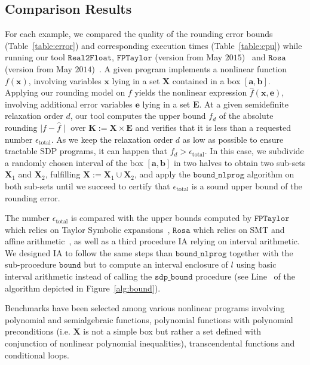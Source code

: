 \documentclass[preprint]{sigplanconf}
\newcommand{\x}{\mathbf{x}}
\newcommand{\e}{\mathbf{e}}
\renewcommand{\b}{\mathbf{b}}
\def\a{\mathbf{a}}
\def\E{\mathbf{E}}
\def\K{\mathbf{K}}
\def\X{\mathbf{X}}
\newcommand{\sdpbound}{\mathtt{sdp\_bound}}
\newcommand{\bound}{\mathtt{bound}}
\newcommand{\boundnlprog}{\mathtt{bound\_nlprog}}
\newcommand{\realtofloat}{\mathtt{Real2Float}}
\newcommand{\rosa}{\mathtt{Rosa}}
\newcommand{\fptaylor}{\mathtt{FPTaylor}}
\theoremstyle{plain}
\begin{document}
\subsection{Comparison Results}
For each example, we compared the quality of the rounding error bounds (Table~\ref{table:error}) and corresponding execution times (Table~\ref{table:cpu}) while running our tool $\realtofloat$, $\fptaylor$ (version from May $2015$)~\cite{fptaylor15} and $\rosa$ (version from  May $2014$)~\cite{Darulova14Popl}.
A given program implements a nonlinear function $f(\x)$, involving variables $\x$ lying in a set $\X$ contained in a box $[\a, \b]$.
Applying our rounding model on $f$ yields the nonlinear expression $\hat{f}(\x,\e)$, involving additional error variables $\e$ lying in a set $\E$. 
At a given semidefinite relaxation order $d$, our tool computes the upper bound $f_d$ of the absolute rounding $\mid f - \hat{f} \mid $ over $\K := \X \times \E$ and verifies that it is less than a requested number $\epsilon_{\text{total}}$. As we keep the relaxation order $d$ as low as possible to ensure tractable SDP programs, it can happen that $f_d > \epsilon_{\text{total}}$. 
 In this case, we subdivide a randomly chosen interval of the box  $[\a, \b]$ in two halves to obtain two sub-sets $\X_1$ and $\X_2$, fulfilling $\X := \X_1 \cup \X_2$, and apply the $\boundnlprog$ algorithm on both sub-sets until we succeed to certify that $\epsilon_{\text{total}}$ is a sound upper bound of the rounding error.

The number $\epsilon_{\text{total}}$ is compared with the upper bounds computed by $\fptaylor$ which relies on Taylor Symbolic expansions~\cite{fptaylor15}, $\rosa$ which relies on SMT and affine arithmetic~\cite{Darulova14Popl}, as well as a third procedure IA relying on interval arithmetic. We designed IA to follow the same steps than $\boundnlprog$ together with the sub-procedure $\bound$ but to compute an interval enclosure of $l$ using basic interval arithmetic instead of calling the $\sdpbound$ procedure (see Line~ of the algorithm depicted in Figure~\ref{alg:bound}).

Benchmarks have been selected among various nonlinear programs involving polynomial and semialgebraic functions, polynomial functions with polynomial preconditions (i.e. $\X$ is not a simple box but rather a set defined with conjunction of nonlinear polynomial inequalities), transcendental functions  and conditional loops.
\end{document}
